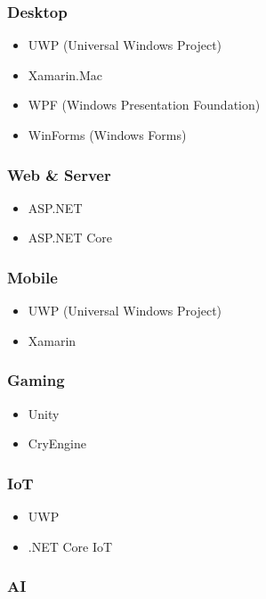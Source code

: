 \documentclass{article}
\begin{document}
\subsubsection{Desktop}

\begin{itemize}
    \item UWP (Universal Windows Project)
    \item Xamarin.Mac
    \item WPF (Windows Presentation Foundation)
    \item WinForms (Windows Forms)
\end{itemize}

\subsubsection{Web \& Server}
\begin{itemize}
    \item ASP.NET
    \item ASP.NET Core
\end{itemize}

\subsubsection{Mobile}
\begin{itemize}
    \item UWP (Universal Windows Project)
    \item Xamarin
\end{itemize}

\subsubsection{Gaming}
\begin{itemize}
    \item Unity
    \item CryEngine
\end{itemize}

\subsubsection{IoT}
\begin{itemize}
    \item UWP
    \item .NET Core IoT
\end{itemize}

\subsubsection{AI}
\end{document}
